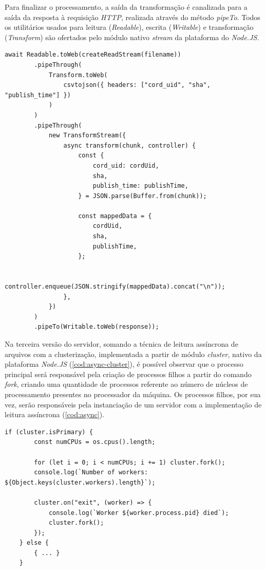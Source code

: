 \documentclass[12pt]{article}
\begin{document}
Para finalizar o processamento, a saída da transformação é canalizada para a saída da resposta à requisição
\textit{HTTP}, realizada através do método \textit{pipeTo}. Todos os utilitários
usados para leitura (\textit{Readable}), escrita (\textit{Writable}) e transformação (\textit{Transform}) são ofertados
pelo módulo nativo \textit{stream} da plataforma do \textit{Node.JS}.

\begin{lstlisting}[caption={Implementação da leitura do arquivo de forma assíncrona}, label=cod:async]
	await Readable.toWeb(createReadStream(filename))
		.pipeThrough(
			Transform.toWeb(
				csvtojson({ headers: ["cord_uid", "sha", "publish_time"] })
			)
		)
		.pipeThrough(
			new TransformStream({
				async transform(chunk, controller) {
					const {
						cord_uid: cordUid,
						sha,
						publish_time: publishTime,
					} = JSON.parse(Buffer.from(chunk));

					const mappedData = {
						cordUid,
						sha,
						publishTime,
					};

					controller.enqueue(JSON.stringify(mappedData).concat("\n"));
				},
			})
		)
		.pipeTo(Writable.toWeb(response));
\end{lstlisting}

Na terceira versão do servidor, somando a técnica de leitura
assíncrona de arquivos com a clusterização, implementada a partir de módulo \textit{cluster}, nativo da plataforma
\textit{Node.JS} (\autoref{cod:async-cluster}), é possível observar que o processo principal será responsável pela criação de processos filhos a partir
do comando \textit{fork}, criando uma quantidade de processos referente ao número de núcleos de processamento presentes
no processador da máquina. Os processos filhos, por sua vez, serão responsáveis pela instanciação de um servidor com 
a implementação de leitura assíncrona (\autoref{cod:async}).

\begin{lstlisting}[caption={Implementação da técnica de clusterização}, label=cod:async-cluster]
	if (cluster.isPrimary) {
		const numCPUs = os.cpus().length;

		for (let i = 0; i < numCPUs; i += 1) cluster.fork();
		console.log(`Number of workers: ${Object.keys(cluster.workers).length}`);

		cluster.on("exit", (worker) => {
			console.log(`Worker ${worker.process.pid} died`);
			cluster.fork();
		});
	} else {
		{ ... }
	}
\end{lstlisting}
\end{document}

